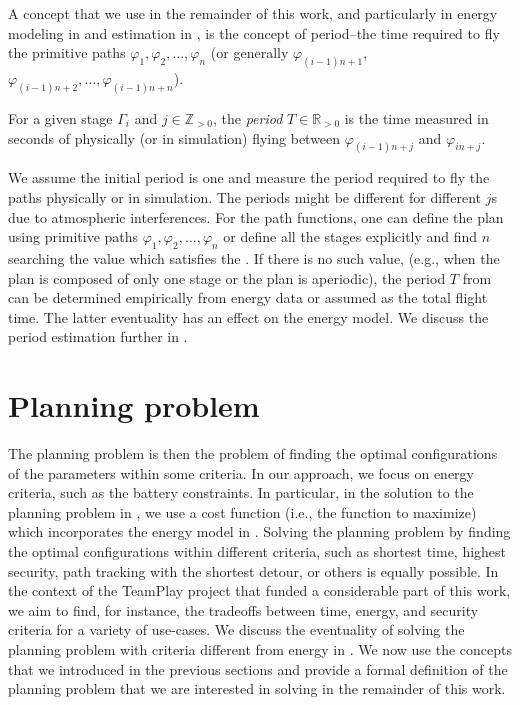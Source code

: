 A concept that we use in the remainder of this work, and particularly in energy modeling in  and estimation in , is the concept of period--the time required to fly the primitive paths $\varphi_1,\varphi_2,\dots,\varphi_n$ (or generally $\varphi_{(i-1)n+1},$ $\varphi_{(i-1)n+2},\dots,\varphi_{(i-1)n+n}$). 

\begin{highlight}
  \begin{defn}[Period]\label{def:period}
    For a given stage $\Gamma_i$ and $j\in\mathbb{Z}_{>0}$, the \emph{period} $T\in\mathbb{R}_{> 0}$ is the time measured in seconds of physically (or in simulation) flying between $\varphi_{(i-1)n+j}$ and $\varphi_{in+j}$.
  \end{defn} 
\end{highlight}
  
We assume the initial period is one and measure the period required to fly the paths physically or in simulation. The periods might be different for different $j$s due to atmospheric interferences. For the path functions, one can define the plan using primitive paths $\varphi_1,\varphi_2,\dots,\varphi_n$ or define all the stages explicitly and find $n$ searching the value which satisfies the . If there is no such value, (e.g., when the plan is composed of only one stage or the plan is aperiodic), the period $T$ from  can be determined empirically from energy data or assumed as the total flight time. The latter eventuality has an effect on the energy model. We discuss the period estimation further in .


\section{Planning problem}
\label{sec:plan-pb}

The planning problem is then the problem of finding the optimal configurations of the parameters within some criteria. In our approach, we focus on energy criteria, such as the battery constraints. In particular, in the solution to the planning problem in , we use a cost function (i.e., the function to maximize) which incorporates the energy model in . Solving the planning problem by finding the optimal configurations within different criteria, such as shortest time, highest security, path tracking with the shortest detour, or others is equally possible. In the context of the TeamPlay project that funded a considerable part of this work, we aim to find, for instance, the tradeoffs between time, energy, and security criteria for a variety of use-cases. We discuss the eventuality of solving the planning problem with criteria different from energy in . We now use the concepts that we introduced in the previous sections and provide a formal definition of the planning problem that we are interested in solving in the remainder of this work.


